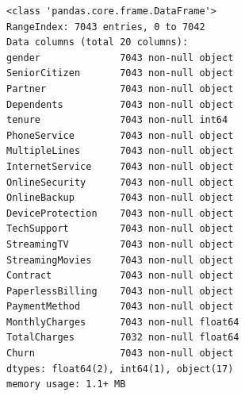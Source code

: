 \documentclass[8pt,onecolumn,aps,pra]{revtex4-1}
\begin{document}
    \begin{Verbatim}[commandchars=\\\{\}]
<class 'pandas.core.frame.DataFrame'>
RangeIndex: 7043 entries, 0 to 7042
Data columns (total 20 columns):
gender              7043 non-null object
SeniorCitizen       7043 non-null object
Partner             7043 non-null object
Dependents          7043 non-null object
tenure              7043 non-null int64
PhoneService        7043 non-null object
MultipleLines       7043 non-null object
InternetService     7043 non-null object
OnlineSecurity      7043 non-null object
OnlineBackup        7043 non-null object
DeviceProtection    7043 non-null object
TechSupport         7043 non-null object
StreamingTV         7043 non-null object
StreamingMovies     7043 non-null object
Contract            7043 non-null object
PaperlessBilling    7043 non-null object
PaymentMethod       7043 non-null object
MonthlyCharges      7043 non-null float64
TotalCharges        7032 non-null float64
Churn               7043 non-null object
dtypes: float64(2), int64(1), object(17)
memory usage: 1.1+ MB

    \end{Verbatim}
\end{document}
